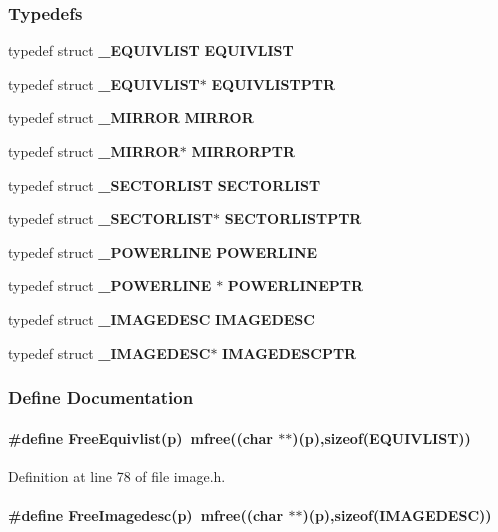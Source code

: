 \subsubsection*{Typedefs}
\begin{CompactItemize}
\item 
typedef struct {\bf \_\-EQUIVLIST}
 {\bf EQUIVLIST}
\item 
typedef struct {\bf \_\-EQUIVLIST}$\ast$ {\bf EQUIVLISTPTR}
\item 
typedef struct {\bf \_\-MIRROR}
 {\bf MIRROR}
\item 
typedef struct {\bf \_\-MIRROR}$\ast$ {\bf MIRRORPTR}
\item 
typedef struct {\bf \_\-SECTORLIST}
 {\bf SECTORLIST}
\item 
typedef struct {\bf \_\-SECTORLIST}$\ast$ {\bf SECTORLISTPTR}
\item 
typedef struct {\bf \_\-POWERLINE}
 {\bf POWERLINE}
\item 
typedef struct {\bf \_\-POWERLINE} $\ast$ {\bf POWERLINEPTR}
\item 
typedef struct {\bf \_\-IMAGEDESC}
 {\bf IMAGEDESC}
\item 
typedef struct {\bf \_\-IMAGEDESC}$\ast$ {\bf IMAGEDESCPTR}
\end{CompactItemize}


\subsubsection{Define Documentation}
\label{image.h_a10}
\paragraph{\setlength{\rightskip}{0pt plus 5cm}\#define Free\-Equivlist(p)\ mfree((char $\ast$$\ast$)(p),sizeof({\bf EQUIVLIST}))}\hfill



Definition at line 78 of file image.h.\label{image.h_a11}
\paragraph{\setlength{\rightskip}{0pt plus 5cm}\#define Free\-Imagedesc(p)\ mfree((char $\ast$$\ast$)(p),sizeof({\bf IMAGEDESC}))}\hfill



